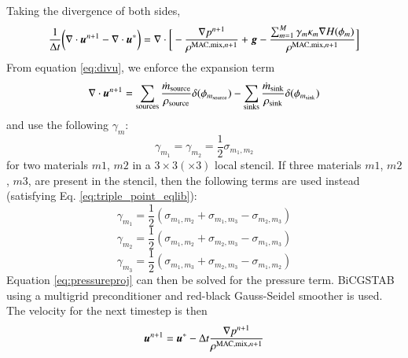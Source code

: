 \documentclass[preprint,12pt]{Definitions/elsarticle}
\newcommand{\tn}{\textnormal}
\newcommand{\bmg}{\mbox{\boldmath $g$\unboldmath}}
\newcommand{\bmu}{\mbox{\boldmath $u$\unboldmath}}
\begin{document}
\begin{enumerate}
	Taking the divergence of both sides, 
	\begin{equation}
	\frac{1}{\Delta t} \bigg(\nabla \cdot \bmu^{n+1} - \nabla\cdot\bmu^{\ast}\bigg) = \nabla\cdot \bigg[-\frac{\nabla p^{n+1}}{\rho^{\tn{MAC,mix},n+1}}+\bmg-
	\frac{\sum_{m=1}^{M} \gamma_{m}\kappa_{m}\nabla H(\phi_{m})}
	{\rho^{\tn{MAC,mix},n+1}}\bigg]
	\label{eq:pressureproj}
	\end{equation}
	From equation \ref{eq:divu}, we enforce the expansion term
	\begin{equation}
	\nabla \cdot \bmu^{n+1} = 
	\sum_{\tn{sources}} 
	\frac{\dot{m}_{\tn{source}}}
	{\rho_{\tn{source}}}\delta(\phi_{m_{\tn{source}}}) -
	\sum_{\tn{sinks}} 
	\frac{\dot{m}_{\tn{sink}}}
	{\rho_{\tn{sink}}}\delta(\phi_{m_{\tn{sink}}}) 
	\end{equation}
	and use the following $\gamma_m$:
	\begin{equation}
	\gamma_{m_1}=\gamma_{m_2}=\frac{1}{2} \sigma_{m_1,m_2}
	\end{equation}
	for two materials $m1$, $m2$ in a $3\times 3(\times 3)$ local stencil. If three materials $m1$, $m2$, $m3$, are present in the stencil, then the following terms are used instead (satisfying Eq. \ref{eq:triple_point_eqlib}):
	\begin{equation}
	\gamma_{m_1}=\frac{1}{2} (\sigma_{m_1,m_2}+\sigma_{m_1,m_3}-\sigma_{m_2,m_3})
	\end{equation}
	\begin{equation}
	\gamma_{m_2}=\frac{1}{2} (\sigma_{m_1,m_2}+\sigma_{m_2,m_3}-\sigma_{m_1,m_3})
	\end{equation}
	\begin{equation}
	\gamma_{m_3}=\frac{1}{2} (\sigma_{m_1,m_3}+\sigma_{m_2,m_3}-\sigma_{m_1,m_2})
	\end{equation}
	Equation \ref{eq:pressureproj} can then be solved for the pressure term. BiCGSTAB using a multigrid preconditioner and red-black Gauss-Seidel smoother is used.\\
	The velocity for the next timestep is then
	\begin{equation}
	\bmu^{n+1} = \bmu^{\ast}-\Delta t\frac{\nabla p^{n+1}}{\rho^{\tn{MAC,mix},n+1}}
	\end{equation}
\end{enumerate}
\end{document}

